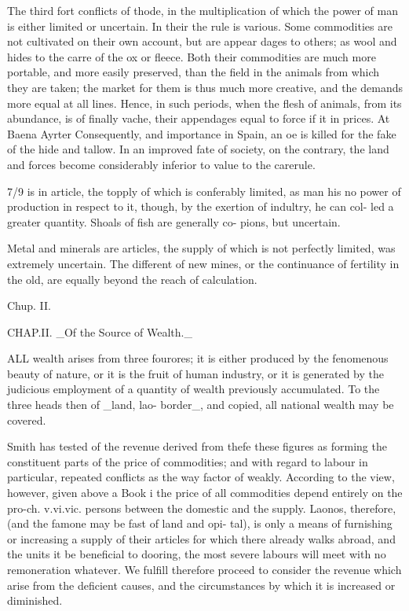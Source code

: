 \documentclass{article}
\begin{document}
The third fort conflicts of thode, in the multiplication of which the power of man is either limited or uncertain. In their the rule is various. Some commodities are not cultivated on their own account, but are appear dages to others; as wool and hides to the carre of the ox or fleece. Both their commodities are much more portable, and more easily preserved, than the field in the animals from which they are taken; the market for them is thus much more creative, and the demands more equal at all lines. Hence, in such periods, when the flesh of animals, from its abundance, is of finally vache, their appendages equal to force if it in prices. At Baena Ayrter Consequently, and importance in Spain, an oe is killed for the fake of the hide and tallow. In an improved fate of society, on the contrary, the land and forces become considerably inferior to value to the carerule.

7/9 is in article, the topply of which is conferably limited, as man his no power of production in respect to it, though, by the exertion of indultry, he can col- led a greater quantity. Shoals of fish are generally co- pions, but uncertain.

Metal and minerals are articles, the supply of which is not perfectly limited, was extremely uncertain. The different of new mines, or the continuance of fertility in the old, are equally beyond the reach of calculation.

Chup. II.

CHAP.II. \_Of the Source of Wealth.\_

ALL wealth arises from three fourores; it is either produced by the fenomenous beauty of nature, or it is the fruit of human industry, or it is generated by the judicious employment of a quantity of wealth previously accumulated. To the three heads then of \_land, lao- border\_, and copied, all national wealth may be covered.

Smith has tested of the revenue derived from thefe these figures as forming the constituent parts of the price of commodities; and with regard to labour in particular, repeated conflicts as the way factor of weakly. According to the view, however, given above a Book i the price of all commodities depend entirely on the pro-ch. v.vi.vic. persons between the domestic and the supply. Laonos, therefore, (and the famone may be fast of land and opi- tal), is only a means of furnishing or increasing a supply of their articles for which there already walks abroad, and the units it be beneficial to dooring, the most severe labours will meet with no remoneration whatever. We fulfill therefore proceed to consider the revenue which arise from the deficient causes, and the circumstances by which it is increased or diminished.
\end{document}
